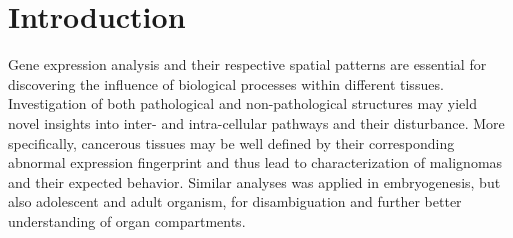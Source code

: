\documentclass[]{article}
\renewcommand{\cite}{\citep}
\begin{document}
%	
%	
%	
%
%

\thispagestyle{empty}
\listoffigures
\newpage
\listoftables
\newpage
{}

\section{Introduction}
\label{sec:introduction}
Gene expression analysis and their respective spatial patterns are essential for discovering the influence of biological processes within different tissues. Investigation of both pathological and non-pathological structures may yield novel insights into inter- and intra-cellular pathways and their disturbance. 
More specifically, cancerous tissues may be well defined by their corresponding abnormal expression fingerprint and thus lead to characterization of malignomas and their expected behavior. Similar analyses was applied in embryogenesis, but also adolescent and adult organism, for disambiguation and further better understanding of organ compartments.\\
\end{document}
